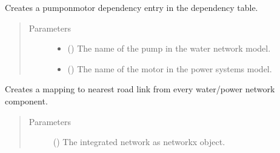 \documentclass[letterpaper,10pt,english]{sphinxmanual}
\begin{document}
\begin{fulllineitems}
\begin{fulllineitems}
\label{\detokenize{apidoc:dreaminsg_integrated_model.src.network_sim_models.interdependencies.DependencyTable.add_pump_motor_coupling}}
\sphinxAtStartPar
Creates a pump\sphinxhyphen{}on\sphinxhyphen{}motor dependency entry in the dependency table.
\begin{quote}\begin{description}
\item[{Parameters}] \leavevmode\begin{itemize}
\item {} 
\sphinxAtStartPar
{} () \textendash{} The name of the pump in the water network model.

\item {} 
\sphinxAtStartPar
{} () \textendash{} The name of the motor in the power systems model.

\end{itemize}

\end{description}\end{quote}

\end{fulllineitems}


\begin{fulllineitems}
\label{\detokenize{apidoc:dreaminsg_integrated_model.src.network_sim_models.interdependencies.DependencyTable.add_transpo_access}}
\sphinxAtStartPar
Creates a mapping to nearest road link from every water/power network component.
\begin{quote}\begin{description}
\item[{Parameters}] \leavevmode
\sphinxAtStartPar
{} (\sphinxstyleliteralemphasis{\sphinxupquote{{[}}}\sphinxstyleliteralemphasis{\sphinxupquote{{]}}}) \textendash{} The integrated network as networkx object.


\end{description}
\end{quote}
\end{fulllineitems}
\end{fulllineitems}
\end{document}
